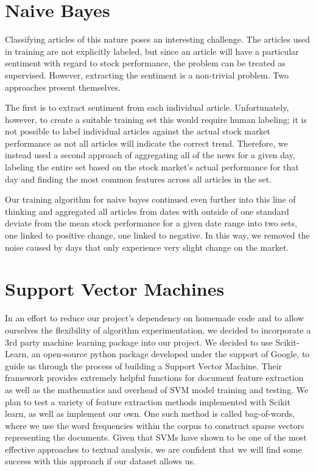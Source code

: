 \documentclass[letterpaper]{article}
\begin{document}
\section{Naive Bayes}
\noindent Classifying articles of this nature poses an interesting challenge. The articles used in training are not explicitly labeled, but since an article will have a particular sentiment with regard to stock performance, the problem can be treated as supervised. However, extracting the sentiment is a non-trivial problem. Two approaches present themselves. 

The first is to extract sentiment from each individual article. Unfortunately, however, to create a suitable training set this would require human labeling; it is not possible to label individual articles against the actual stock market performance as not all articles will indicate the correct trend. Therefore, we instead used a second approach of aggregating all of the news for a given day, labeling the entire set based on the stock market’s actual performance for that day and finding the most common features across all articles in the set. 

Our training algorithm for naive bayes continued even further into this line of thinking and aggregated all articles from dates with outside of one standard deviate from the mean stock performance for a given date range into two sets, one linked to positive change, one linked to negative. In this way, we removed the noise caused by days that only experience very slight change on the market.

\section{Support Vector Machines}
\noindent In an effort to reduce our project's dependency on homemade code and to allow ourselves the flexibility of algorithm experimentation, we decided to incorporate a 3rd party machine learning package into our project. We decided to use Scikit-Learn, an open-source python package developed under the support of Google, to guide us through the process of building a Support Vector Machine. Their framework provides extremely helpful functions for document feature extraction as well as the mathematics and overhead of SVM model training and testing. We plan to test a variety of feature extraction methods implemented with Scikit learn, as well as implement our own. One such method is called bag-of-words, where we use the word frequencies within the corpus to construct sparse vectors representing the documents. Given that SVMs have shown to be one of the most effective approaches to textual analysis, we are confident that we will find some success with this approach if our dataset allows us.
\end{document}
